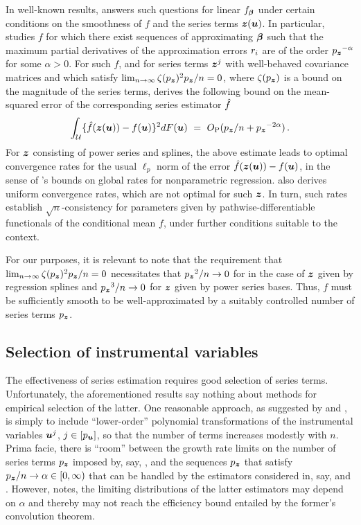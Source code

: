 \documentclass{uwstat572}
\newcommand{\benn}{\begin{equation*}}
\newcommand{\eenn}{\end{equation*}}
\theoremstyle{definition}
\theoremstyle{remark}
\newcommand{\ga}{\alpha}
\newcommand{\Prb}{\mathrm{P}}
\newcommand{\bs}[1]{\boldsymbol{#1}}
\numberwithin{equation}{section}
\begin{document}
In well-known results, \cite{N97} answers such questions for linear $\fb$ under certain conditions on the smoothness of $f$ and the series terms $\z(\u)$. In particular, \cite{N97} studies $f$ for which there exist sequences of approximating $\regb$ such that the maximum partial derivatives of the approximation errors $r_i$ are of the order $\pz^{-\ga}$ for some $\ga > 0$. For such $f$, and for series terms $\z^j$ with well-behaved covariance matrices and which satisfy $\lim_{n\to\infty} \zeta(\pz)^2\pz/n = 0$, where $\zeta(\pz)$ is a bound on the magnitude of the series terms, \cite{N97} derives the following bound on the mean-squared error of the corresponding series estimator $\hat{f}$
\benn
	\int_{\Us} \{\fhc(\z(\u)) - f(\u)\}^2 dF(\u) \ = \ O_\Prb(\pz/n + \pz^{-2\ga}) \,.
\eenn
For $\z$ consisting of power series and splines, the above estimate leads to optimal convergence rates for the usual $\ell_p$ norm of the error $\fhc(\z(\u)) - f(\u)$, in the sense of \cite{S82}'s bounds on global rates for nonparametric regression. \cite{N97} also derives uniform convergence rates, which are not optimal for such $\z$. In turn, such rates establish $\sqrt{n}$-consistency for parameters given by pathwise-differentiable functionals of the conditional mean $f$, under further conditions suitable to the context.  

For our purposes, it is relevant to note that the requirement that $\lim_{n\to\infty} \zeta(\pz)^2\pz/n = 0$ necessitates that $\pz^2/n \to 0$ for in the case of $\z$ given by regression splines and $\pz^3/n \to 0$ for $\z$ given by power series bases. Thus, $f$ must be sufficiently smooth to be well-approximated by a suitably controlled number of series terms $\pz$.


%
\subsection{Selection of instrumental variables}
\renewcommand{\P}{\bs{P}}

The effectiveness of series estimation requires good selection of series terms. Unfortunately, the aforementioned results say nothing about methods for empirical selection of the latter. One reasonable approach, as suggested by \cite{A74} and \cite{K71}, is simply to include ``lower-order'' polynomial transformations of the instrumental variables $\u^j$, $j\in[\pu]$, so that the number of terms increases modestly with $n$. Prima facie, there is ``room'' between the growth rate limits on the number of series terms $\pz$ imposed by, say, \cite{N97}, and the sequences $\pz$ that satisfy $\pz/n \to \ga \in [0, \infty)$ that can be handled by the estimators considered in, say, \cite{B94} and \cite{HHN08}. However, \cite{H02} notes, the limiting distributions of the latter estimators may depend on $\ga$ and thereby may not reach the efficiency bound entailed by the former's convolution theorem. 
\end{document}
